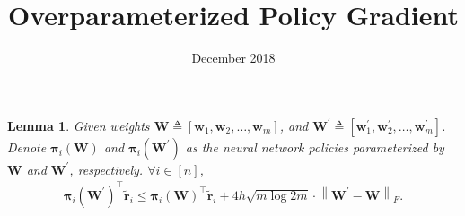 \documentclass[10pt]{article}
\title{Overparameterized Policy Gradient}
\author{}
\date{December 2018}
\def\rvw{{\mathbf{w}}}
\def\rvtilder{{\tilde{\mathbf{r}}}}
\newtheorem{lem}{Lemma}
\def\rvpi{{\boldsymbol{\pi}}}
\def\rmW{{\mathbf{W}}}
\begin{document}

\begin{lem}
    Given weights $\rmW \triangleq \left[ \rvw_1, \rvw_2, \dots, \rvw_m \right]$, and $\rmW^\prime \triangleq \left[ \rvw_1^\prime, \rvw_2^\prime, \dots, \rvw_m^\prime \right]$. Denote $\rvpi_i\left( \rmW \right)$ and $\rvpi_i\left( \rmW^\prime \right)$ as the neural network policies parameterized by $\rmW$ and $\rmW^\prime$, respectively. $\forall i \in [n]$,
\begin{equation*}
\begin{split}
    \rvpi_i\left( \rmW^\prime \right)^\top \rvtilder_i \le \rvpi_i\left( \rmW \right)^\top \rvtilder_i + 4 h  \sqrt{m \log{2m}} \cdot \left\| \rmW^\prime - \rmW \right\|_F.
\end{split}
\end{equation*}
\end{lem}
\end{document}
